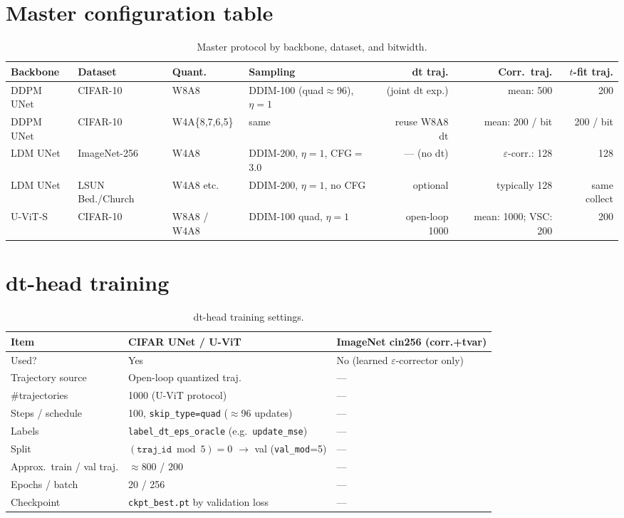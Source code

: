\documentclass[11pt]{article}
\newcommand{\trajid}{\texttt{traj\_id}}
\newcommand{\valmod}{\texttt{val\_mod}=5}
\begin{document}
\section{Master configuration table}

\begin{table}[t]
\centering
\caption{Master protocol by backbone, dataset, and bitwidth.}
\label{tab:master}
\footnotesize
\begin{tabular}{@{}llllrrr@{}}
\toprule
\textbf{Backbone} & \textbf{Dataset} & \textbf{Quant.} & \textbf{Sampling} & \textbf{dt traj.} & \textbf{Corr.\ traj.} & \textbf{$t$-fit traj.} \\
\midrule
DDPM UNet & CIFAR-10 & W8A8
  & DDIM-100 (quad$\approx$96), $\eta{=}1$
  & (joint dt exp.) & mean: 500 & 200 \\
DDPM UNet & CIFAR-10 & W4A\{8,7,6,5\}
  & same
  & reuse W8A8 dt & mean: 200 / bit & 200 / bit \\
LDM UNet & ImageNet-256 & W4A8
  & DDIM-200, $\eta{=}1$, CFG$=$3.0
  & --- (no dt) & $\varepsilon$-corr.: 128 & 128 \\
LDM UNet & LSUN Bed./Church & W4A8 etc.
  & DDIM-200, $\eta{=}1$, no CFG
  & optional & typically 128 & same collect \\
U-ViT-S & CIFAR-10 & W8A8 / W4A8
  & DDIM-100 quad, $\eta{=}1$
  & open-loop 1000 & mean: 1000; VSC: 200 & 200 \\
\bottomrule
\end{tabular}
\end{table}

\section{dt-head training}

\begin{table}[t]
\centering
\caption{dt-head training settings.}
\label{tab:dt}
\begin{tabular}{@{}lll@{}}
\toprule
\textbf{Item} & \textbf{CIFAR UNet / U-ViT} & \textbf{ImageNet cin256 (corr.+tvar)} \\
\midrule
Used? & Yes & No (learned $\varepsilon$-corrector only) \\
Trajectory source & Open-loop quantized traj. & --- \\
\#trajectories & 1000 (U-ViT protocol) & --- \\
Steps / schedule & 100, \texttt{skip\_type=quad} ($\approx$96 updates) & --- \\
Labels & \texttt{label\_dt\_eps\_oracle} (e.g.\ \texttt{update\_mse}) & --- \\
Split & $(\trajid \bmod 5)=0$ $\rightarrow$ val (\valmod) & --- \\
Approx.\ train / val traj. & $\approx 800$ / $200$ & --- \\
Epochs / batch & 20 / 256 & --- \\
Checkpoint & \texttt{ckpt\_best.pt} by validation loss & --- \\
\bottomrule
\end{tabular}
\end{table}
\end{document}
